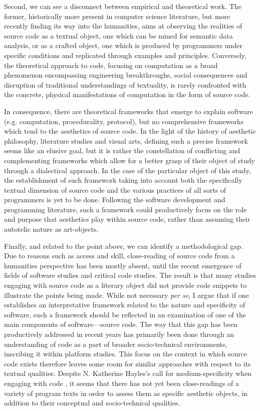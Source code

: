Second, we can see a disconnect between empirical and theoretical work. The former, historically more present in computer science literature, but more recently finding its way into the humanities, aims at observing the realities of source code as a textual object, one which can be mined for semantic data analysis, or as a crafted object, one which is produced by programmers under specific conditions and replicated through examples and principles. Conversely, the theoretical approach to code, focusing on computation as a broad phenomenon encompassing engineering breakthroughs, social consequences and disruption of traditional understandings of textuality, is rarely confronted with the concrete, physical manifestations of computation in the form of source code.

In consequence, there are theoretical frameworks that emerge to explain software (e.g. computation, procedurality, protocol), but no comprehensive frameworks which tend to the aesthetics of source code. In the light of the history of aesthetic philosophy, literature studies and visual arts, defining such a precise framework seems like an elusive goal, but it is rather the constellation of conflicting and complementing frameworks which allow for a better grasp of their object of study through a dialectical approach. In the case of the particular object of this study, the establishment of such framework taking into account both the specifically textual dimension of source code and the various practices of all sorts of programmers is yet to be done. Following the software development and programming literature, such a framework could productively focus on the role and purpose that aesthetics play within source code, rather than assuming their autotelic nature as art-objects.

Finally, and related to the point above, we can identify a methodological gap. Due to reasons such as access and skill, close-reading of source code from a humanities perspective has been mostly absent, until the recent emergence of fields of software studies and critical code studies. The result is that many studies engaging with source code as a literary object did not provide code snippets to illustrate the points being made. While not necessary \emph{per se}, I argue that if one establishes an interpretative framework related to the nature and specificity of software, such a framework should be reflected in an examination of one of the main components of software—source code. The way that this gap has been productively addressed in recent years has primarily been done through an understanding of code as a part of broader socio-technical environments, inscribing it within platform studies. This focus on the context in which source code exists therefore leaves some room for similar approaches with respect to its textual qualities. Despite N. Katherine Hayles's call for medium-specificity when engaging with code \citep{hayles_print_2004}, it seems that there has not yet been close-readings of a variety of program texts in order to assess them as specific aesthetic objects, in addition to their conceptual and socio-technical qualities.


